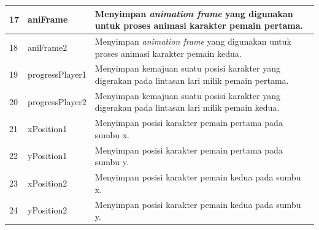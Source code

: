 \begin{enumerate}
\begin{enumerate}
\begin{enumerate}
\begin{table}[H]
\begin{tabular}{|p{0.35cm}|p{3cm}|p{7cm}|}
					17 & aniFrame & Menyimpan \textit{animation frame} yang digunakan untuk proses animasi karakter pemain pertama. \\ \hline
					18 & aniFrame2 & Menyimpan \textit{animation frame} yang digunakan untuk proses animasi karakter pemain kedua. \\ \hline
					19 & progressPlayer1 & Menyimpan kemajuan suatu posisi karakter yang digerakan pada lintasan lari milik pemain pertama. \\ \hline
					20 & progressPlayer2 & Menyimpan kemajuan suatu posisi karakter yang digerakan pada lintasan lari milik pemain kedua. \\ \hline
					21 & xPosition1 & Menyimpan posisi karakter pemain pertama pada sumbu x. \\ \hline
					22 & yPosition1 & Menyimpan posisi karakter pemain pertama pada sumbu y. \\ \hline
					23 & xPosition2 & Menyimpan posisi karakter pemain kedua pada sumbu x. \\ \hline
					24 & yPosition2 & Menyimpan posisi karakter pemain kedua pada sumbu y. \\ \hline
				\end{tabular}
				\label{table:atribut_gameplayDesktopScript}
			\end{table}

\end{enumerate}
\end{enumerate}
\end{enumerate}
